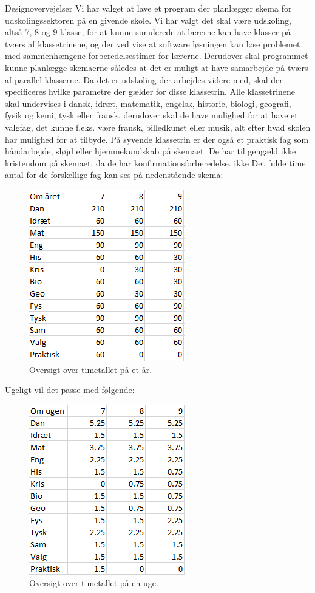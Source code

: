 Designovervejelser
Vi har valget at lave et program der planlægger skema for udskolingssektoren på en givende skole. Vi har valgt det skal være udskoling, altså 7, 8 og 9 klasse, for at kunne simulerede at lærerne kan have klasser på tværs af klassetrinene, og der ved vise at software løsningen kan løse problemet med sammenhængene forberedelsestimer for lærerne. Derudover skal programmet kunne planlægge skemaerne således at det er muligt at have samarbejde på tværs af parallel klasserne\cite{interview}.  Da det er udskoling der arbejdes videre med, skal der specificeres hvilke parametre der gælder for disse klassetrin. Alle klassetrinene skal undervises i dansk, idræt, matematik, engelsk, historie, biologi, geografi, fysik og kemi, tysk eller fransk, derudover skal de have mulighed for at have et valgfag, det kunne f.eks. være fransk, billedkunst eller musik, alt efter hvad skolen har mulighed for at tilbyde. På syvende klassetrin er der også et praktisk fag som håndarbejde, sløjd eller hjemmekundskab på skemaet. De har til gengæld ikke kristendom på skemaet, da de har konfirmationsforberedelse\cite{lov2016}. ikke Det fulde time antal for de forskellige fag kan ses på nedenstående skema:
\begin{figure}[h]
  \centering
  \includegraphics[scale = 0.9]{partials/graphics/antalaftimerpaaetaar.png}
  \caption{Oversigt over timetallet på et år\cite{timetal2016}.}
  \label{fig:Timetal et år}
\end{figure}


Ugeligt vil det passe med følgende:
\begin{figure}[h]
  \centering
  \includegraphics[scale = 0.9]{partials/graphics/antalaftimerpaaenuge.png}
  \caption{Oversigt over timetallet på en uge\cite{timetal2016}.}
  \label{fig:timetal en uge}
\end{figure}

